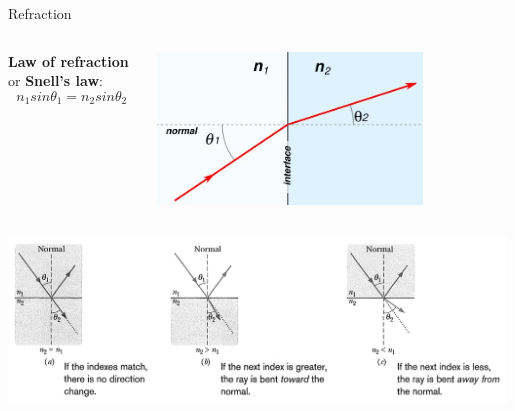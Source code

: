 \begin{frame}{Refraction}

\begin{columns}
  \begin{column}{0.66\textwidth}
   \begin{center}
      {\bf Law of refraction} or {\bf Snell's law}:
     \begin{equation*}
          n_1 sin\theta_1 = n_2 sin\theta_2
      \end{equation*}
   \end{center}
  \end{column}
  \begin{column}{0.34\textwidth}
    \begin{center}
      \includegraphics[width=0.75\textwidth]{./images/schematics/snells_law}\\
    \end{center}
  \end{column}
\end{columns}

\vspace{0.2cm}

\begin{center}
    \includegraphics[width=0.99\textwidth]{./images/schematics/refraction_direction}\\
\end{center}

\end{frame}



